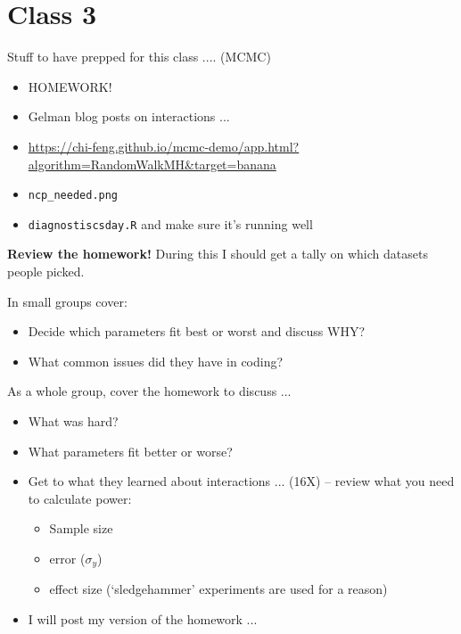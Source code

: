 \documentclass[11pt]{article}
\begin{document}
\newpage
\section{Class 3} 

Stuff to have prepped for this class .... (MCMC) 
\begin{itemize}
\item HOMEWORK!
\item Gelman blog posts on interactions ... 
\item \url{https://chi-feng.github.io/mcmc-demo/app.html?algorithm=RandomWalkMH&target=banana}
\item \verb|ncp_needed.png|
\item \verb|diagnostiscsday.R| and make sure it's running well
\end{itemize}

{\bf Review the homework!} 
  During this I should get a tally on which datasets people picked.

In small groups cover:
\begin{itemize}
\item Decide which parameters fit best or worst and discuss WHY?
\item What common issues did they have in coding?
\end{itemize}

As a whole group, cover the homework to discuss ... 
\begin{itemize}
\item What was hard? 
\item What parameters fit better or worse? 
\item Get to what they learned about interactions ... (16X) -- review what you need to calculate power:
\begin{itemize}
\item Sample size
\item error ($\sigma_y$)
\item effect size (`sledgehammer' experiments are used for a reason)
\end{itemize}
\item I will post my version of the homework ...
\end{itemize}
\end{document}

